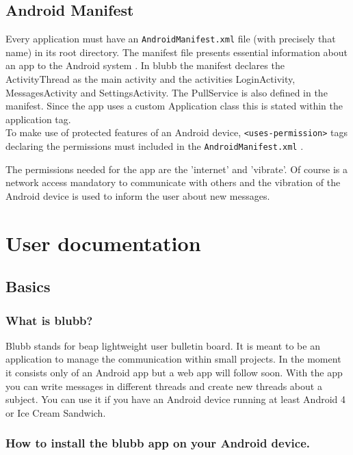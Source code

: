\documentclass[12pt,a4paper,oneside]{report}
\newcommand{\appname}{blubb}
\newcommand{\beap}{beap}
\newcommand{\code}[1]{\lstinline{#1}}
\begin{document}
\section{Android Manifest}
Every application must have an \code{AndroidManifest.xml} file (with precisely that name) in its root directory. The manifest file presents essential information about an app to the Android system \citep{aDefManifest}.
In \appname{} the manifest declares the ActivityThread as the main activity and the activities LoginActivity, MessagesActivity and SettingsActivity. The PullService is also defined in the manifest. Since the app uses a custom Application class this is stated within the application tag.\\

To make use of protected features of an Android device, \code{<uses-permission>} tags declaring the permissions must included in the \code{AndroidManifest.xml} \citep{aDefPermissions}.

The permissions needed for the app are the 'internet' and 'vibrate'. Of course is a network access mandatory to communicate with others and the vibration of the Android device is used to inform the user about new messages. 
\chapter{User documentation}

\section{Basics}
\subsection{What is blubb?}
Blubb stands for \beap{} lightweight user bulletin board. It is meant to be an application to manage the communication within small projects. In the moment it consists only of an Android app but a web app will follow soon. With the app you can write messages in different threads and create new threads about a subject. You can use it if you have an Android device running at least Android 4 or Ice Cream Sandwich.
\subsection{How to install the \appname{} app on your Android device.}
\end{document}
